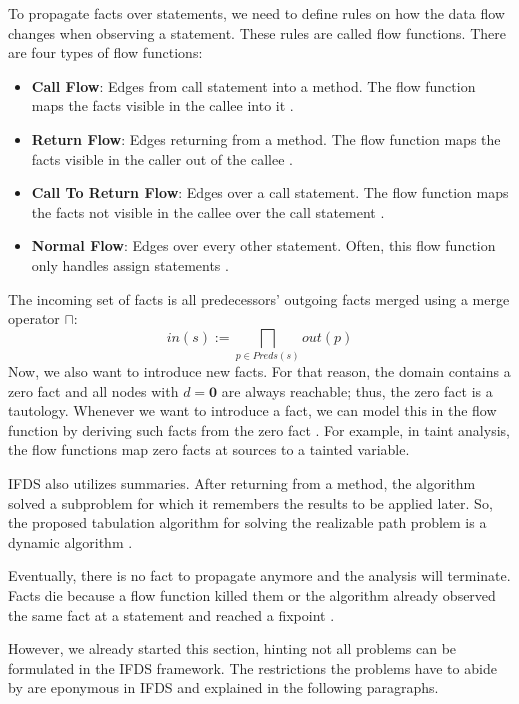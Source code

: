 \documentclass[../draft.tex]{subfiles}
\begin{document}
    To propagate facts over statements, we need to define rules on how the data flow changes when observing a statement. These rules are called flow functions. There are four types of flow functions:
    \begin{itemize}
        \item \textbf{Call Flow}: Edges from call statement into a method. The flow function maps the facts visible in the callee into it \cite{Reps1995}. 
        \item \textbf{Return Flow}: Edges returning from a method. The flow function maps the facts visible in the caller out of the callee \cite{Reps1995}.
        \item \textbf{Call To Return Flow}: Edges over a call statement. The flow function maps the facts not visible in the callee over the call statement \cite{Reps1995}.
        \item \textbf{Normal Flow}: Edges over every other statement. Often, this flow function only handles assign statements \cite{Reps1995}.
    \end{itemize}
    The incoming set of facts is all predecessors' outgoing facts merged using a merge operator $\sqcap$: 
    $$
        in(s) := \bigsqcap_{p \in Preds(s)} out(p)
    $$
    Now, we also want to introduce new facts. For that reason, the domain contains a zero fact and all nodes with $d=\textbf{0}$ are always reachable; thus, the zero fact is a tautology. Whenever we want to introduce a fact, we can model this in the flow function by deriving such facts from the zero fact  \cite{Reps1995}. For example, in taint analysis, the flow functions map zero facts at sources to a tainted variable. 

    IFDS also utilizes summaries. After returning from a method, the algorithm solved a subproblem for which it remembers the results to be applied later. So, the proposed tabulation algorithm for solving the realizable path problem is a dynamic algorithm \cite{Reps1995}. 

    Eventually, there is no fact to propagate anymore and the analysis will terminate. Facts die because a flow function killed them or the algorithm already observed the same fact at a statement and reached a fixpoint \cite{Reps1995}.

    However, we already started this section, hinting not all problems can be formulated in the IFDS framework. The restrictions the problems have to abide by are eponymous in IFDS and explained in the following paragraphs.
\end{document}
